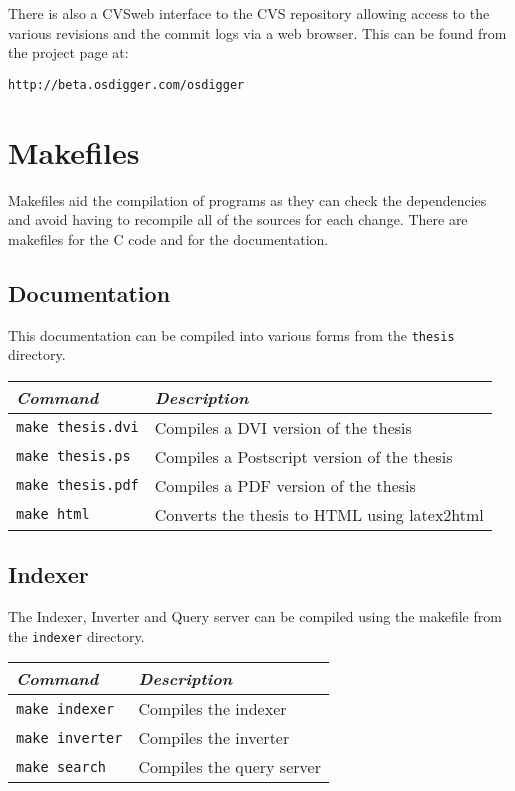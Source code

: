 There is also a CVSweb interface to the CVS repository allowing access to the various revisions and the commit logs via a web browser.  This can be found from the project page at:

\texttt{http://beta.osdigger.com/osdigger}

\section{Makefiles}
Makefiles aid the compilation of programs as they can check the dependencies and avoid having to recompile all of the sources for each change.  There are makefiles for the C code and for the documentation.

\subsection{Documentation}
This documentation can be compiled into various forms from the \texttt{thesis} directory.

\begin{tabular}{l|p{8cm}}
\emph{Command} & \emph{Description} \\
\hline
\texttt{make thesis.dvi} & Compiles a DVI version of the thesis \\
\texttt{make thesis.ps}  & Compiles a Postscript version of the thesis \\
\texttt{make thesis.pdf} & Compiles a PDF version of the thesis \\
\texttt{make html} &  Converts the thesis to HTML using latex2html \\
\end{tabular}

\subsection{Indexer}

The Indexer, Inverter and Query server can be compiled using the makefile from the \texttt{indexer} directory.

\begin{tabular}{l|p{8cm}}
\emph{Command} & \emph{Description} \\
\hline
\texttt{make indexer}  & Compiles the indexer \\
\texttt{make inverter} & Compiles the inverter \\
\texttt{make search}   & Compiles the query server \\
\end{tabular}



